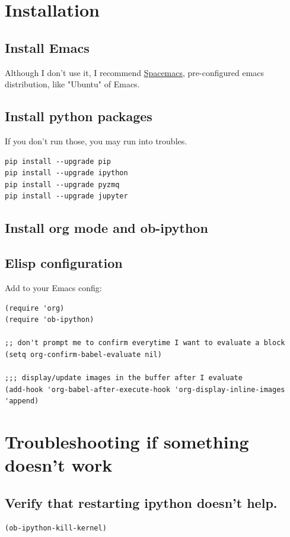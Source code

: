 \documentclass[11pt]{article}
\begin{document}
\section{Installation}
\label{sec:orgheadline33}
\subsection{Install Emacs}
\label{sec:orgheadline29}
Although I don't use it, I recommend \href{http://spacemacs.org/}{Spacemacs}, pre-configured emacs distribution, like "Ubuntu" of Emacs.
\subsection{Install python packages}
\label{sec:orgheadline30}
If you don't run those, you may run into troubles.
\begin{verbatim}
pip install --upgrade pip
pip install --upgrade ipython
pip install --upgrade pyzmq
pip install --upgrade jupyter
\end{verbatim}
\subsection{Install org mode and ob-ipython}
\label{sec:orgheadline31}
\subsection{Elisp configuration}
\label{sec:orgheadline32}
Add to your Emacs config:
\begin{verbatim}
(require 'org)
(require 'ob-ipython)

;; don't prompt me to confirm everytime I want to evaluate a block
(setq org-confirm-babel-evaluate nil)

;;; display/update images in the buffer after I evaluate
(add-hook 'org-babel-after-execute-hook 'org-display-inline-images 'append)
\end{verbatim}
\section{Troubleshooting if something doesn't work}
\label{sec:orgheadline38}
\subsection{Verify that restarting ipython doesn't help.}
\label{sec:orgheadline34}
\begin{verbatim}
(ob-ipython-kill-kernel)
\end{verbatim}
\end{document}
